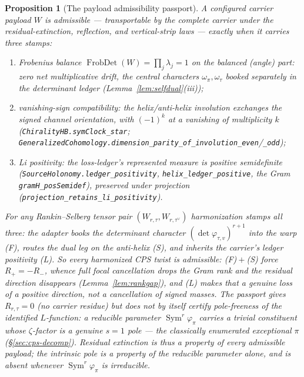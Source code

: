 \documentclass[11pt]{article}
\newtheorem{proposition}[theorem]{Proposition}
\theoremstyle{definition}
\newcommand{\Sym}{\operatorname{Sym}}
\begin{document}
\begin{proposition}[The payload admissibility passport]\label{prop:passport}
A configured carrier payload $W$ is \emph{admissible} --- transportable by the complete carrier
under the residual-extinction, reflection, and vertical-strip laws --- exactly when it carries three stamps:
\begin{enumerate}
\item[\textup{(F)}] \emph{Frobenius balance} $\operatorname{FrobDet}(W)=\prod_j\lambda_j=1$ on the balanced
(angle) part: zero net multiplicative drift, the central characters $\omega_\pi,\omega_\tau$ booked separately in
the determinant ledger (Lemma~\ref{lem:selfdual}(iii));
\item[\textup{(S)}] \emph{vanishing-sign compatibility}: the helix/anti-helix involution exchanges the signed
channel orientation, with $(-1)^k$ at a vanishing of multiplicity $k$ (\texttt{ChiralityHB.symClock\_star};
\texttt{GeneralizedCohomology.dimension\_parity\_of\_involution\_even}/\texttt{\_odd});
\item[\textup{(L)}] \emph{Li positivity}: the loss-ledger's represented measure is positive semidefinite
(\texttt{SourceHolonomy.ledger\_positivity}, \texttt{helix\_ledger\_positive}, the Gram
\texttt{gramH\_posSemidef}), preserved under projection (\texttt{projection\_retains\_li\_positivity}).
\end{enumerate}
For any Rankin--Selberg tensor pair $(W_{r,\tau},W_{r,\tau^\vee})$ harmonization stamps all three: the adapter
books the determinant character $(\det\varphi_{\tau,v})^{r+1}$ into the warp \textup{(F)}, routes the dual leg
on the anti-helix \textup{(S)}, and inherits the carrier's ledger positivity \textup{(L)}. So \emph{every}
harmonized CPS twist is admissible: \textup{(F)}${}+{}$\textup{(S)} force $R_+=-R_-$, whence full focal
cancellation drops the Gram rank and the residual direction disappears (Lemma~\ref{lem:rankgap}), and
\textup{(L)} makes that a genuine loss of a positive direction, not a cancellation of signed masses. The
passport gives $R_{r,\tau}=0$ (no carrier residue) but does \emph{not} by itself certify pole-freeness of the
identified $L$-function: a reducible parameter $\Sym^r\varphi_\pi$ carries a trivial constituent whose
$\zeta$-factor is a genuine $s=1$ pole --- the classically enumerated exceptional $\pi$ (\S\ref{sec:cps-decomp}).
Residual extinction is thus a property of \emph{every} admissible payload; the intrinsic pole is a property of
the reducible parameter alone, and is absent whenever $\Sym^r\varphi_\pi$ is irreducible.
\end{proposition}
\end{document}
